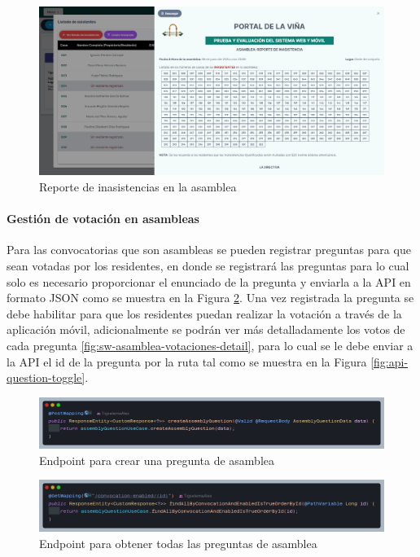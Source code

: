 \begin{figure}[H]
    \centering
    \includegraphics[width=1\textwidth]{resources/images/sw-asamblea-asistencia-reporte}
    \caption{Reporte de inasistencias en la asamblea}
    \label{fig:sw-asamblea-asistencia-reporte}
\end{figure}

\paragraph{Gestión de votación en asambleas}

Para las convocatorias que son asambleas se pueden registrar preguntas para que sean votadas por los residentes, en donde se registrará las preguntas para lo cual solo es necesario proporcionar el enunciado de la pregunta y enviarla a la API en formato JSON como se muestra en la Figura \ref{fig:api-question-create}.
Una vez registrada la pregunta se debe habilitar para que los residentes puedan realizar la votación a través de la aplicación móvil, adicionalmente se podrán ver más detalladamente los votos de cada pregunta \ref{fig:sw-asamblea-votaciones-detail}, para lo cual se le debe enviar a la API el id de la pregunta por la ruta tal como se muestra en la Figura \ref{fig:api-question-toggle}.

\begin{figure}[H]
    \centering
    \includegraphics[width=1\textwidth]{resources/images/api-pregunta-crear}
    \caption{Endpoint para crear una pregunta de asamblea}
    \label{fig:api-question-create}
\end{figure}

\begin{figure}[H]
    \centering
    \includegraphics[width=1\textwidth]{resources/images/api-pregunta-listar-todos}
    \caption{Endpoint para obtener todas las preguntas de asamblea}
    \label{fig:api-question-all}
\end{figure}

